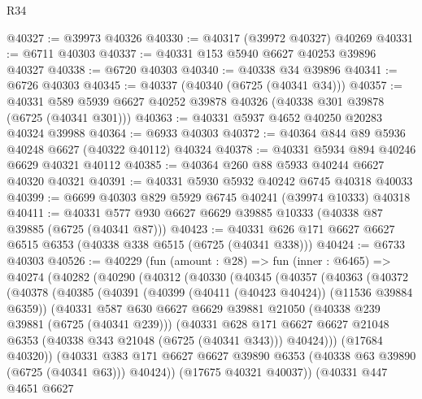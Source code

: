 \begin{lexlean}{R34}
\begin{coremodule}
@40327 := @39973 @40326
@40330 := @40317 (@39972 @40327) @40269
@40331 := @6711 @40303
@40337 := @40331 @153 @5940 @6627 @40253 @39896 @40327
@40338 := @6720 @40303
@40340 := @40338 @34 @39896
@40341 := @6726 @40303
@40345 := @40337 (@40340 (@6725 (@40341 @34)))
@40357 := @40331 @589 @5939 @6627 @40252 @39878 @40326 (@40338 @301 @39878 (@6725 (@40341 @301)))
@40363 := @40331 @5937 @4652 @40250 @20283 @40324 @39988
@40364 := @6933 @40303
@40372 := @40364 @844 @89 @5936 @40248 @6627 (@40322 @40112) @40324
@40378 := @40331 @5934 @894 @40246 @6629 @40321 @40112
@40385 := @40364 @260 @88 @5933 @40244 @6627 @40320 @40321
@40391 := @40331 @5930 @5932 @40242 @6745 @40318 @40033
@40399 := @6699 @40303 @829 @5929 @6745 @40241 (@39974 @10333) @40318
@40411 := @40331 @577 @930 @6627 @6629 @39885 @10333 (@40338 @87 @39885 (@6725 (@40341 @87)))
@40423 := @40331 @626 @171 @6627 @6627 @6515 @6353 (@40338 @338 @6515 (@6725 (@40341 @338)))
@40424 := @6733 @40303
@40526 := @40229
    (fun (amount : @28) =>
    fun (inner : @6465) =>
    @40274
      (@40282
        (@40290
          (@40312
            (@40330
              (@40345
                (@40357
                  (@40363
                    (@40372
                      (@40378
                        (@40385
                          (@40391
                            (@40399 (@40411 (@40423 @40424)) (@11536 @39884 @6359))
                            (@40331
                              @587
                              @630
                              @6627
                              @6629
                              @39881
                              @21050
                              (@40338 @239 @39881 (@6725 (@40341 @239)))
                              (@40331
                                @628
                                @171
                                @6627
                                @6627
                                @21048
                                @6353
                                (@40338 @343 @21048 (@6725 (@40341 @343)))
                                @40424)))
                          (@17684 @40320))
                        (@40331
                          @383
                          @171
                          @6627
                          @6627
                          @39890
                          @6353
                          (@40338 @63 @39890 (@6725 (@40341 @63)))
                          @40424))
                      (@17675 @40321 @40037))
                    (@40331
                      @447
                      @4651
                      @6627

\end{coremodule}
\end{lexlean}
